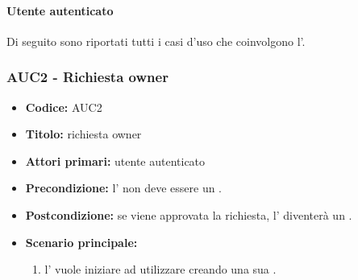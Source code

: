 \documentclass[casi-duso]{subfiles}
\begin{document}
\paragraph{Utente autenticato}%
\label{par:utente-autenticato}
Di seguito sono riportati tutti i casi d'uso che coinvolgono l'.

\subsubsection{AUC2 - Richiesta owner}%
\label{subsub:AUC2}
\begin{itemize}
  \item \textbf{Codice:} AUC2
  \item \textbf{Titolo:} richiesta owner
  \item \textbf{Attori primari:} utente autenticato
  \item \textbf{Precondizione:} l' non deve essere un .
  \item \textbf{Postcondizione:} se viene approvata la richiesta, l' diventerà un .
  \item \textbf{Scenario principale:}
  \begin{enumerate}
    \item l' vuole iniziare ad utilizzare  creando una sua .
  \end{enumerate}
\end{itemize}
\end{document}
